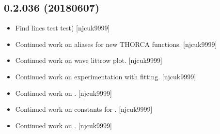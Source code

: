\documentclass[a4paper,10pt,english]{report}
\begin{document}
\subsection{0.2.036 (2018\sphinxhyphen{}06\sphinxhyphen{}07)}
\label{\detokenize{misc/changelog:id444}}\begin{itemize}
\item {} 
Find lines test  test) {[}njcuk9999{]}

\item {} 
Continued work on  \sphinxhyphen{} aliases for new THORCA functions.
{[}njcuk9999{]}

\item {} 
Continued work on  \sphinxhyphen{} wave littrow plot. {[}njcuk9999{]}

\item {} 
Continued work on  \sphinxhyphen{} experimentation with fitting. {[}njcuk9999{]}

\item {} 
Continued work on . {[}njcuk9999{]}

\item {} 
Continued work on  \sphinxhyphen{} constants for . {[}njcuk9999{]}

\item {} 
Continued work on . {[}njcuk9999{]}

\end{itemize}
\end{document}
